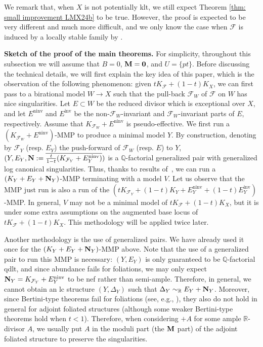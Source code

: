 \documentclass[12pt]{amsart}
\numberwithin{equation}{section}
\newcommand{\Mm}{{\bf{M}}}
\newcommand{\Nn}{{\bf{N}}}
\newcommand{\Qq}{\mathbb{Q}}
\newcommand{\Rr}{\mathbb{R}}
\newcommand{\ninv}{\operatorname{ninv}}
\newcommand{\inv}{\operatorname{inv}}
\newcommand{\Ff}{\mathcal{F}}
\theoremstyle{definition}
\theoremstyle{definition}
\theoremstyle{definition}
\begin{document}
We remark that, when $X$ is not potentially klt, we still expect Theorem \ref{thm: small improvement LMX24b} to be true. However, the proof is expected to be very different and much more difficult, and we only know the case when $\Ff$ is induced by a locally stable family by \cite{MZ23}.

\medskip

\noindent\textbf{Sketch of the proof of the main theorems.} 
For simplicity, throughout this subsection we will assume that $B=0$, $\Mm=\bm{0}$, and $U=\{pt\}$.
Before discussing the technical details, we will first explain the key idea of this paper, which is the observation of the following phenomenon: 
given $tK_{\Ff}+(1-t)K_X$, we can first pass to a birational model $W \rightarrow X$ such that the pull-back $\Ff_W$ of $\Ff$ on $W$ has nice singularities. 
Let $E \subset W$ be the reduced divisor which is exceptional over $X$, and let $E^{\ninv}$ and $E^{\inv}$ be the non-$\Ff_W$-invariant and $\Ff_W$-invariant parts of $E$, respectively. 
Assume that $K_{\Ff_W}+E^{\ninv}$ is pseudo-effective. We first run a $(K_{\Ff_W}+E^{\ninv})$-MMP to produce a minimal model $Y$. 
By construction, denoting by $\Ff_Y$ (resp. $E_Y$)
the push-forward of $\Ff_W$ 
(resp. $E$)
to $Y$, 
$(Y,E_Y,\Nn:=\overline{\frac{t}{1-t}(K_{\Ff_Y}+E_Y^{\ninv})})$ is a $\Qq$-factorial generalized pair with generalized log canonical singularities. 
Thus, thanks to results of~\cite{BZ16,HL23}, we can run a $(K_Y+E_Y+\Nn_Y)$-MMP terminating with a model $V$. 
Let us observe that the MMP just run  is also a run of the 
$(tK_{\Ff_Y}+(1-t)K_Y+E_Y^{\ninv}+(1-t)E_Y^{\inv})$-MMP.
In general, $V$ may not be a minimal model of $tK_{\Ff}+(1-t)K_X$, but it is under some extra assumptions on the augmented base locus of $tK_{\Ff}+(1-t)K_X$. This methodology will be applied twice later.

Another methodology is the use of generalized pairs. We have already used it once for the $(K_Y+E_Y+\Nn_Y)$-MMP above. Note that the use of a generalized pair to run this MMP is necessary: $(Y,E_Y)$ is only guaranteed to be $\Qq$-factorial qdlt, and since abundance fails for foliations, we may only expect $\Nn_Y=K_{\Ff_Y}+E_Y^{\ninv}$ to be nef rather than semi-ample. Therefore, in general, we cannot obtain an lc structure $(Y,\Delta_Y)$ such that $\Delta_Y\sim_{\mathbb{R}}E_Y+\Nn_Y$. Moreover, since Bertini-type theorems fail for foliations (see, e.g., \cite[Example 3.4]{DLM23}), they also do not hold in general for adjoint foliated structures (although some weaker Bertini-type theorems hold when $t<1$). Therefore, when considering $+A$ for some ample $\Rr$-divisor $A$, we usually put $A$ in the moduli part (the $\Mm$ part) of the adjoint foliated structure to preserve the singularities.
\end{document}
